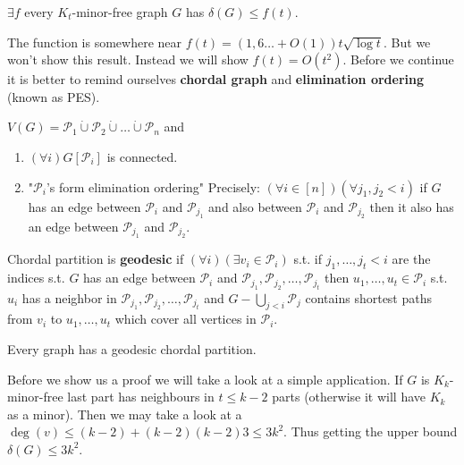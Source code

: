 \begin{thm}
	$\exists f$ every $K_{t}$-minor-free graph $G$ has $\delta(G) \leq f(t)$.
\end{thm}

The function is somewhere near $f(t) = (1,6\dots + O(1)) t \sqrt{\log t}$. But we won't show this result. Instead we will show $f(t) = O(t^{2})$. Before we continue it is better to remind ourselves \textbf{chordal graph} and \textbf{elimination ordering} (known as PES).

\begin{defn}
	$V(G) = \mathcal{P}_{1} \dot{\cup} \mathcal{P}_{2} \dot{\cup} \dots \dot{\cup} \mathcal{P}_{n}$ and
	
	\begin{enumerate}
		\item $(\forall i) G[\mathcal{P}_{i}]$ is connected.
		\item "$\mathcal{P}_{i}$'s form elimination ordering" Precisely: $(\forall i \in [n])(\forall j_{1},j_{2} < i)$ if $G$ has an edge between $\mathcal{P}_{i}$ and $\mathcal{P}_{j_{1}}$ and also between $\mathcal{P}_{i}$ and $\mathcal{P}_{j_{2}}$ then it also has an edge between $\mathcal{P}_{j_{1}}$ and $\mathcal{P}_{j_{2}}$.
	\end{enumerate}
\end{defn}

\begin{defn}
	Chordal partition is \textbf{geodesic} if $(\forall i) (\exists v_{i} \in \mathcal{P}_{i})$ s.t. if $j_{1}, \dots, j_{t} < i$ are the indices s.t. $G$ has an edge between $\mathcal{P}_{i}$ and $\mathcal{P}_{j_{1}}, \mathcal{P}_{j_{2}}, \dots, \mathcal{P}_{j_{t}}$ then $u_{1}, \dots, u_{t} \in \mathcal{P}_{i}$ s.t. $u_{i}$ has a neighbor in $\mathcal{P}_{j_{1}}, \mathcal{P}_{j_{2}}, \dots, \mathcal{P}_{j_{t}}$ and $G - \bigcup_{j < i} \mathcal{P}_{j}$ contains shortest paths from $v_{i}$ to $u_{1}, \dots, u_{t}$ which cover all vertices in $\mathcal{P}_{i}$.
\end{defn}


\begin{thm}
	Every graph has a geodesic chordal partition.
\end{thm}

Before we show us a proof we will take a look at a simple application. If $G$ is $K_{k}$-minor-free last part has neighbours in $t \leq k-2$ parts (otherwise it will have $K_{k}$ as a minor). Then we may take a look at a $\deg(v) \leq (k-2) + (k-2)(k-2)3 \leq 3k^{2}$. Thus getting the upper bound $\delta(G) \leq 3k^{2}$.

